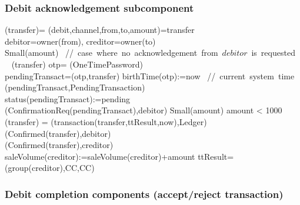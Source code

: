  
 \subsubsection{Debit acknowledgement subcomponent}
 
 \begin{asm}
 	(transfer)=\+
 	\LET (debit,channel,from,to,amount)=transfer \\
 	\LET debitor=owner(from), creditor=owner(to)\\
 	\IF Small(amount) 
 	\mbox{  // case where no acknowledgement from $debitor$ is requested}\+
 	\THEN ~ (transfer) \-
 	\ELSE \+
 	\LET otp= \NEW(OneTimePassword)\\
 	\LET pendingTransact=(otp,transfer)\+
 	birthTime(otp):=now \mbox{ // current system time}\\
 	(pendingTransact,PendingTransaction)\\ 
 	status(pendingTransact):=pending \\
 	(ConfirmationReq(pendingTransact),\TO debitor)
 	\dec\-
 	\WHERE \+
 	Small(amount) \IFF amount < 1000 \\
 	(transfer) =\+     
 	(transaction(transfer,ttResult,now),Ledger)\\
 	(Confirmed(transfer),\TO debitor)\\
 	(Confirmed(transfer),\TO creditor)\\
 	saleVolume(creditor):=saleVolume(creditor)+amount \-
 	ttResult=(group(creditor),CC,CC)
 \end{asm}
 
 \subsubsection{Debit completion components (accept/reject transaction)}
 
 
 
